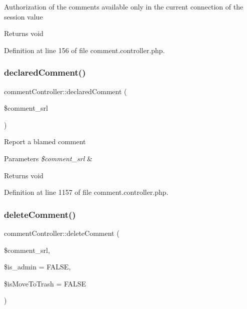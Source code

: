 Authorization of the comments available only in the current connection of the session value \begin{DoxyReturn}{Returns}
void 
\end{DoxyReturn}


Definition at line 156 of file comment.\+controller.\+php.

\hypertarget{classcommentController_aaae1e5860a1e170a8fc3142f80bbcde6}{}\label{classcommentController_aaae1e5860a1e170a8fc3142f80bbcde6} 
\subsubsection{\texorpdfstring{declared\+Comment()}{declaredComment()}}
{\footnotesize\ttfamily comment\+Controller\+::declared\+Comment (\begin{DoxyParamCaption}\item[{}]{\$comment\+\_\+srl }\end{DoxyParamCaption})}

Report a blamed comment 
\begin{DoxyParams}{Parameters}
{\em \$comment\+\_\+srl} & \\
\hline
\end{DoxyParams}
\begin{DoxyReturn}{Returns}
void 
\end{DoxyReturn}


Definition at line 1157 of file comment.\+controller.\+php.

\hypertarget{classcommentController_adfd7bfdb249d109119f85e72aca2253c}{}\label{classcommentController_adfd7bfdb249d109119f85e72aca2253c} 
\subsubsection{\texorpdfstring{delete\+Comment()}{deleteComment()}}
{\footnotesize\ttfamily comment\+Controller\+::delete\+Comment (\begin{DoxyParamCaption}\item[{}]{\$comment\+\_\+srl,  }\item[{}]{\$is\+\_\+admin = {\ttfamily FALSE},  }\item[{}]{\$is\+Move\+To\+Trash = {\ttfamily FALSE} }\end{DoxyParamCaption})}

